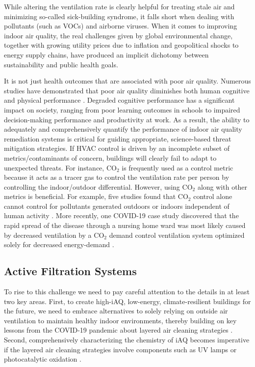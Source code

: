 \documentclass[journal=jacsat,manuscript=article]{achemso}
\begin{document}
While altering the ventilation rate is clearly helpful for treating stale air and minimizing so-called sick-building syndrome, it falls short when dealing with pollutants (such as VOCs) and airborne viruses. When it comes to improving indoor air quality, the real challenges given by global environmental change, together with growing utility prices due to inflation and geopolitical shocks to energy supply chains, have produced an implicit dichotomy between sustainability and public health goals. 

It is not just health outcomes that are associated with poor air quality. Numerous studies have demonstrated that poor air quality diminishes both human cognitive and physical performance \citep{Krebs2021AirPC, Gao2021ShorttermAP, Carneiro2021TheEO, Ni2021AssociationsOP, Shehab2019EffectsOS}. Degraded cognitive performance has a significant impact on society, ranging from poor learning outcomes in schools to impaired decision-making performance and productivity at work. As a result, the ability to adequately and comprehensively quantify the performance of indoor air quality remediation systems is critical for guiding appropriate, science-based threat mitigation strategies. If HVAC control is driven by an incomplete subset of metrics/contaminants of concern, buildings will clearly fail to adapt to unexpected threats. For instance, CO$_2$ is frequently used as a control metric because it acts as a tracer gas to control the ventilation rate per person by controlling the indoor/outdoor differential. However, using CO$_2$ along with other metrics is beneficial. For example, five studies found that CO$_2$ control alone cannot control for pollutants generated outdoors or indoors independent of human activity \cite{zaatari_impact_2016}. More recently, one COVID-19 case study discovered that the rapid spread of the disease through a nursing home ward was most likely caused by decreased ventilation by a CO$_2$ demand control ventilation system optimized solely for decreased energy-demand \cite{lamping_air_nodate}.

\subsection{Active Filtration Systems}

To rise to this challenge we need to pay careful attention to the details in at least two key areas. First, to create high-iAQ, low-energy, climate-resilient buildings for the future, we need to embrace alternatives to solely relying on outside air ventilation to maintain healthy indoor environments, thereby building on key lessons from the COVID-19 pandemic about layered air cleaning strategies \citep{enVeridWhitePaper}. Second, comprehensively characterizing the chemistry of iAQ becomes imperative if the layered air cleaning strategies  involve components such as UV lamps \citep{peng2023significant, Denny2010IntegratedPF, Nitter2019UVTA, Peng2023SignificantPO} or photocatalytic oxidation \citep{Lorencik2015IndoorAQ, Mata2022IndoorAQ, Nath2014PHOTOCATALYTICOO}.
\end{document}
